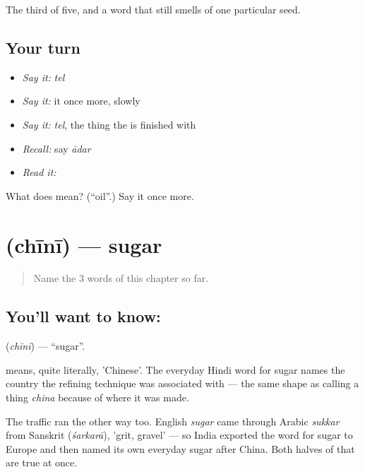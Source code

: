 \begin{grammarlens}[title={What you've built}]
The third of five, and a word that still smells of one particular seed.
\end{grammarlens}

\subsection*{Your turn}
\begin{itemize}
\raggedright
  \item \emph{Say it:} \emph{tel}
  \item \emph{Say it:} it once more, slowly
  \item \emph{Say it:} \emph{tel}, the thing the  is finished with
  \item \emph{Recall:} say \emph{ādar}
  \item \emph{Read it:} \textbf{}
\end{itemize}

\begin{tcolorbox}[breakable,colback=teal!4,colframe=teal!35!black,title={Before you move on}]
What does  mean? (\textquotedblleft{}oil\textquotedblright{}.) Say it once more.
\end{tcolorbox}
\section[\texorpdfstring{\hi{चीनी} (chīnī)}{चीनी (chīnī)}]{ (chīnī) — sugar}

\label{lesson:HI-C52-sugar}



\begin{quote}
Name the 3 words of this chapter so far.
\end{quote}

\subsection*{You'll want to know: }
\textbf{} (\emph{chīnī}) — \textquotedblleft{}sugar\textquotedblright{}.

 means, quite literally, 'Chinese'. The everyday Hindi word for sugar names the country the refining technique was associated with — the same shape as calling a thing \emph{china} because of where it was made.

The traffic ran the other way too. English \emph{sugar} came through Arabic \emph{sukkar} from Sanskrit  (\emph{śarkarā}), 'grit, gravel' — so India exported the word for sugar to Europe and then named its own everyday sugar after China. Both halves of that are true at once.

